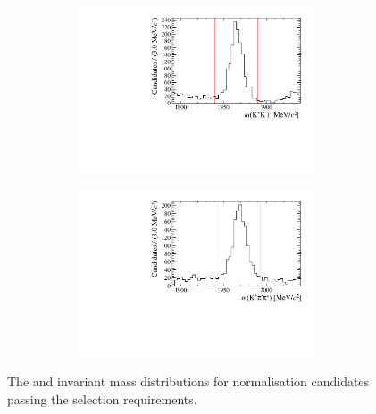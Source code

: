 \begin{figure}[!h]
\begin{subfigure}[t]{1.0\textwidth}
\begin{subfigure}[t]{0.35\textwidth}
        \centering
        \includegraphics[width=1.0\textwidth]{figs/Selection/Phimass_KPiPi_B2DsD0.pdf}
     \end{subfigure}
     \begin{subfigure}[t]{0.35\textwidth}
        \centering
        \includegraphics[width=1.0\textwidth]{figs/Selection/Dmass_KPiPi_B2DsD0.pdf}
     \end{subfigure}
     \caption{\decay{\Dsp}{\Kp\pim\pip}}
   \end{subfigure}
   \caption{The \Dsp and \Dzb invariant mass distributions for normalisation \decay{\Bp}{\Dsp\Dzb} candidates passing the selection requirements.}
   \label{fig:d_phi_mass_normlaisation}   
\end{figure}



